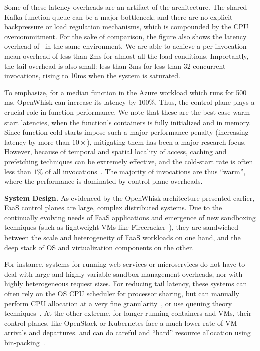 Some of these latency overheads are an artifact of the architecture. 
The shared Kafka function queue can be a major bottleneck; and there are no explicit backpressure or load regulation mechanisms, which is compounded by the CPU overcommitment. 
%
For the sake of comparison, the figure also shows the latency overhead of \sysname~in the same environment. 
We are able to achieve a per-invocation mean overhead of less than 2ms for almost all the load conditions.
Importantly, the tail overhead is also small: less than 3ms for less than 32 concurrent invocations, rising to 10ms when the system is saturated.


To emphasize, for a median function in the Azure workload which runs for 500 ms, OpenWhisk can increase its latency by 100\%.  
Thus, the control plane plays a crucial role in function performance.
We note that these are the best-case warm-start latencies, when the function's containers is fully initialized and in memory. 
Since function cold-starts impose such a major performance penalty (increasing latency by more than $10\times$), mitigating them has been a major research focus. 
However, because of temporal and spatial locality of access, caching and prefetching techniques can be extremely effective, and the cold-start rate is often less than $1\% $ of all invocations~\cite{faascache-asplos21}. 
The majority of invocations are thus ``warm'', where the performance is dominated by control plane overheads.

\noindent \textbf{System Design.}
%
As evidenced by the OpenWhisk architecture presented earlier, FaaS control planes are large, complex distributed systems.
Due to the continually evolving needs of FaaS applications and emergence of new sandboxing techniques (such as lightweight VMs like Firecracker~\cite{firecracker-nsdi20}), they are sandwiched between the scale and heterogeneity of FaaS workloads on one hand, and the deep stack of OS and virtualization components on the other. 

For instance, systems for running web services or microservices do not have to deal with large and highly variable sandbox management overheads, nor with highly heterogeneous request sizes.
For reducing tail latency, these systems can often rely on the OS CPU scheduler for processor sharing, but can manually perform CPU allocation at a very fine granularity~\cite{kaffes2019shinjuku}, or use queuing theory techniques~\cite{prekas2017zygos}. 
At the other extreme, for longer running containers and VMs, their control planes, like OpenStack or Kubernetes face a much lower rate of VM arrivals and departures. and can do careful and ``hard'' resource allocation using bin-packing~\cite{cortez2017resource}.


